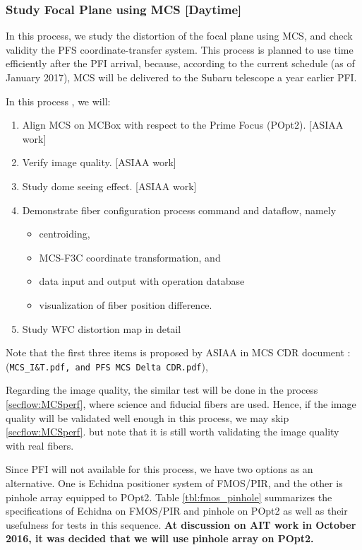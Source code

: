 \subsubsection{Study Focal Plane using MCS [Daytime]}\label{secflow:prestudy}
In this process, we study the distortion of the focal plane using MCS, and check validity the PFS coordinate-transfer system.
This process is planned to use time efficiently after the PFI arrival, because, according to the current schedule (as of January 2017), MCS will be delivered to the Subaru telescope a year earlier PFI.

In this process , we will:
\begin{enumerate}
\item Align MCS on MCBox with respect to the Prime Focus (POpt2). [ASIAA work]
\item Verify image quality. [ASIAA work]
\item Study dome seeing effect. [ASIAA work]
\item Demonstrate fiber configuration process command and dataflow, namely 
	\begin{itemize}
	\item centroiding, 
	\item MCS-F3C coordinate transformation, and
	\item data input and output with operation database 
	\item visualization of fiber position difference.
	\end{itemize}
\item Study WFC distortion map in detail
\end{enumerate}
Note that the first three items is proposed by ASIAA in MCS CDR document : ({\tt MCS\_I\&T.pdf, and PFS MCS Delta CDR.pdf}),

Regarding the image quality, the similar test will be done in the process \ref{secflow:MCSperf}, where science and fiducial fibers are used.
Hence, if the image quality will be validated well enough in this process, we may skip \ref{secflow:MCSperf}.
but note that it is still worth validating the image quality with real fibers.

Since PFI will not available for this process, we have two options as an alternative.
One is Echidna positioner system of FMOS/PIR, and the other is pinhole array equipped to POpt2.
Table \ref{tbl:fmos_pinhole} summarizes the specifications of Echidna on FMOS/PIR and pinhole on POpt2 as well as their usefulness for tests in this sequence. 
{\bf At discussion on AIT work in October 2016, it was decided that we will use pinhole array on POpt2. }

